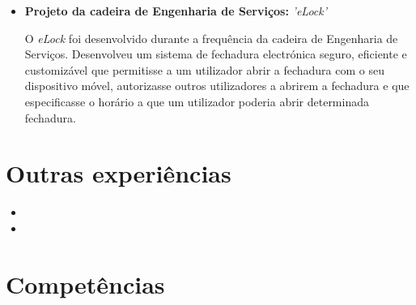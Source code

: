 \documentclass[11pt,a4paper,sans]{moderncv} %
\begin{document}
\begin{itemize}
\vspace{6pt}

\item{\textbf{Projeto da cadeira de Engenharia de Serviços: }\textit{'eLock'}}

\vspace{3pt}

\small{O \textit{eLock} foi desenvolvido durante a frequência da cadeira de
  Engenharia de Serviços. Desenvolveu um sistema de fechadura electrónica
  seguro, eficiente e customizável que permitisse a um utilizador abrir a
  fechadura com o seu dispositivo móvel, autorizasse outros utilizadores a
  abrirem a fechadura e que especificasse o horário a que um utilizador poderia
  abrir determinada fechadura.}

\end{itemize}

\section{Outras experiências}

\vspace{6pt}

\begin{itemize}
\item{}

\vspace{6pt}

\item{}
\end{itemize}

\section{Competências}

\vspace{6pt}
\end{document}
